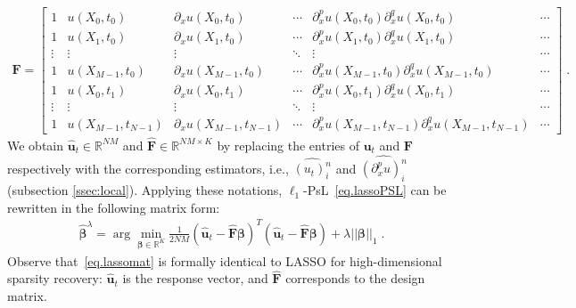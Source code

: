 \documentclass[a4paper,11pt]{article}
\newcommand{\bbeta}{\bm{\beta}}
\newcommand{\bF}{\mathbf{F}}
\newcommand{\bu}{\mathbf{u}}
\theoremstyle{definition}
\begin{document}
\begin{align*}
\mathbf{F} =\begin{bmatrix}
 	1&u(X_0,t_0) & \partial_xu(X_0,t_0)  &\cdots& \partial^p_xu(X_0,t_0)\partial_x^qu(X_0,t_0) &\cdots\\
 	1&u(X_1,t_0) & \partial_xu(X_1,t_0)  &\cdots& \partial^p_xu(X_1,t_0)\partial_x^qu(X_1,t_0) &\cdots\\
 	\vdots&\vdots& \vdots&\ddots&\vdots&\cdots\\
 	1&u(X_{M-1},t_0) & \partial_xu(X_{M-1},t_0)  &\cdots& \partial^p_xu(X_{M-1},t_0)\partial_x^qu(X_{M-1},t_0) &\cdots\\
 	1&u(X_{0},t_1) & \partial_xu(X_{0},t_1)  &\cdots& \partial^p_xu(X_{0},t_1)\partial_x^qu(X_{0},t_1) &\cdots\\
 	\vdots&\vdots& \vdots&\ddots&\vdots&\cdots\\
 	1&u(X_{M-1},t_{N-1})&\partial_xu(X_{M-1},t_{N-1})&\cdots& \partial^p_xu(X_{M-1},t_{N-1})\partial_x^qu(X_{M-1},t_{N-1})  &\cdots
 	\end{bmatrix}\;.%
\end{align*}
We obtain $\widehat{\mathbf{u}}_t\in\mathbb{R}^{NM}$ and $\widehat{\mathbf{F}}\in\mathbb{R}^{NM\times K}$  by replacing the entries of $\mathbf{u}_t$ and $\mathbf{F}$ respectively with the corresponding estimators, i.e., $\widehat{(u_t)_i^n}$ and $\widehat{(\partial_x^pu)_i^n}$ (subsection \ref{ssec:local}).  Applying these notations, $\ell_1$-PsL~\eqref{eq.lassoPSL} can be rewritten in the following matrix form:
\begin{align}
\widehat{\bbeta}^\lambda=\arg\min_{\bbeta\in\mathbb{R}^K}\frac{1}{2NM}(\widehat{\bu}_t-\widehat{\bF}\bbeta)^T(\widehat{\bu}_t-\widehat{\bF}\bbeta)+\lambda||\bbeta||_1\;.\label{eq.lassomat}
\end{align}
Observe that~\eqref{eq.lassomat} is formally identical to LASSO for high-dimensional sparsity recovery: $\widehat{\bu}_t$ is the response vector, and $\widehat{\bF}$ corresponds to the design matrix.
\end{document}
